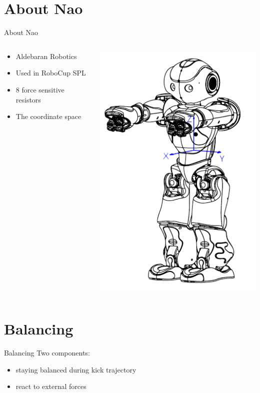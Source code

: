 \documentclass{beamer}
\begin{document}
\section{About Nao}
\begin{frame}{About Nao}
\begin{columns}[T]
    \begin{column}{.5\textwidth}
	\vspace{20 mm}
	\begin{itemize}
		\item Aldebaran Robotics
        \item Used in RoboCup SPL
	   	\item 8 force sensitive resistors
		\item The coordinate space
	\end{itemize}	
    \end{column}
    \begin{column}{.5\textwidth}

    \includegraphics[scale=0.5]{pics/hardware_inertialunit.png}

    \end{column}
  \end{columns}
\end{frame}

\section{Balancing}
\begin{frame}{Balancing}
  Two components:
  \begin{itemize}
    \item staying balanced during kick trajectory
    \item react to external forces
  \end{itemize}
\end{frame}
\end{document}
